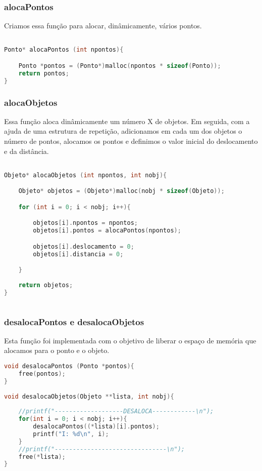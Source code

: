 \documentclass{article}
\begin{document}
\subsubsection{alocaPontos}

Criamos essa função para alocar, dinâmicamente, vários pontos.

\begin{lstlisting}[caption={Função alocaPontos},label={lst:cod2},language=C]

Ponto* alocaPontos (int npontos){

    Ponto *pontos = (Ponto*)malloc(npontos * sizeof(Ponto));
    return pontos;
}

\end{lstlisting}

\subsubsection{alocaObjetos}

Essa função aloca dinâmicamente um número X de objetos. Em seguida, com a ajuda de
uma estrutura de repetição, adicionamos em cada um dos objetos o número de pontos,
alocamos os pontos e definimos o valor inicial do deslocamento e da distância.

\begin{lstlisting}[caption={Função alocaObjetos},label={lst:cod3},language=C]

Objeto* alocaObjetos (int npontos, int nobj){

    Objeto* objetos = (Objeto*)malloc(nobj * sizeof(Objeto));

    for (int i = 0; i < nobj; i++){

        objetos[i].npontos = npontos;
        objetos[i].pontos = alocaPontos(npontos);

        objetos[i].deslocamento = 0;
        objetos[i].distancia = 0;

    }
    
    return objetos;
}
    
    \end{lstlisting}

\subsubsection{desalocaPontos e desalocaObjetos}
Esta função foi implementada com o objetivo de liberar o espaço de memória que alocamos para o ponto e o objeto.

\begin{lstlisting}[caption={Funções desalocaPontos e desalocaObjetos},label={lst:cod4},language=C]
void desalocaPontos (Ponto *pontos){
    free(pontos);
}
    
void desalocaObjetos(Objeto **lista, int nobj){
    
    //printf("-------------------DESALOCA------------\n");
    for(int i = 0; i < nobj; i++){
        desalocaPontos((*lista)[i].pontos);
        printf("I: %d\n", i);
    }
    //printf("-------------------------------\n");
    free(*lista);
}

\end{lstlisting}
\end{document}
